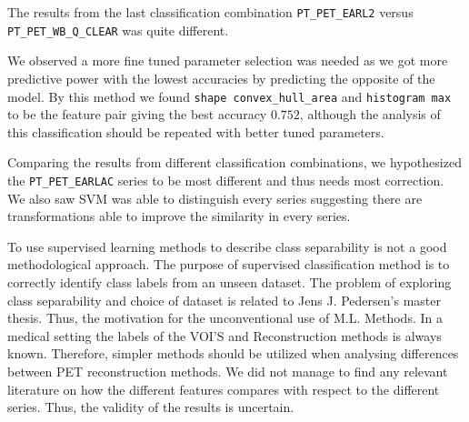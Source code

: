 The results from the last classification combination
 \verb|PT_PET_EARL2| versus \verb|PT_PET_WB_Q_CLEAR| was quite different. 



 We observed a more fine tuned 
 parameter selection was needed as we got more predictive power with the lowest accuracies by predicting the 
 opposite of the model. By this method we found \verb|shape convex_hull_area| and \verb|histogram max| 
 to be the feature pair giving the best accuracy $0.752$, although the analysis of this classification 
 should be repeated with better tuned parameters. 

 Comparing the results from different classification combinations, we hypothesized the \verb|PT_PET_EARLAC| 
 series to be most different and thus needs most correction. We also saw SVM was able to distinguish every series 
 suggesting there are transformations able to improve the similarity in every series. 




To use supervised learning methods to describe class separability is not a
good methodological approach. The purpose of supervised classification
method is to correctly identify class labels from an unseen dataset.     
The problem of exploring class separability and choice of dataset is
related to Jens J. Pedersen's master thesis. Thus, the motivation for the 
unconventional use of M.L. Methods. In a medical setting the labels of the
VOI'S and Reconstruction methods is always known. Therefore, simpler methods
should be utilized when analysing differences between PET reconstruction
methods. We did not manage to find any relevant literature on how the different features compares
with respect to the different series. Thus, the validity of the results is
uncertain. 
 




% 
